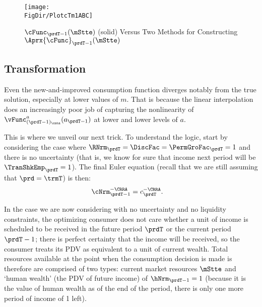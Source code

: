 \documentclass[\econtexRoot/SolvingMicroDSOPs]{subfiles}
\begin{document}
\hypertarget{PlotcTm1ABC}{}
\begin{figure}
  \centerline{\texttt{[image: \\FigDir/PlotcTm1ABC]}}
  \caption{$\cFunc_{\prdT-1}(\mStte)$ (solid) Versus Two Methods for Constructing $\Aprx{\cFunc}_{\prdT-1}(\mStte)$}
  \label{fig:PlotcTm1ABC}
\end{figure}

\hypertarget{transformation}{}
\subsection{Transformation}\label{subsec:transformation}

Even the new-and-improved consumption function diverges notably from the true
solution, especially at lower values of ${m}$.  That is because the
linear interpolation does an increasingly poor job of capturing the
nonlinearity of $\vFunc_{({\prdT-1})_\cntn}^{{a}}({a}_{\prdT-1})$ at
lower and lower levels of ${a}$.

This is where we unveil our next trick.  To understand the logic,
start by considering the case where $\RNrm_{\prdT} = \DiscFac =
\PermGroFac_{\prdT} = 1$ and there is no uncertainty
(that is, we know for sure that income next period
will be $\TranShkEmp_{\prdT} = 1$).  The final Euler equation (recall that we are still assuming that $\prd=\trmT$) is then:
\begin{equation}\begin{gathered}\begin{aligned}
      \cNrm_{\prdT-1}^{-\CRRA}  & = {c}_{\prdT}^{-\CRRA}.
    \end{aligned}\end{gathered}\end{equation}

In the case we are now considering with no uncertainty and no liquidity constraints, the optimizing consumer does not care whether a unit of income is scheduled to be received in the future period $\prdT$ or the current period $\prdT-1$; there is perfect certainty that the income will be received, so the consumer treats its PDV as equivalent to a unit of current wealth.  Total resources available at the point when the consumption decision is made is therefore are comprised of two types: current market resources $\mStte$ and `human wealth' (the PDV of future income) of $\hNrm_{\prdT-1}=1$ (because it is the value of human wealth as of the end of the period, there is only one more period of income of 1 left).
\end{document}
